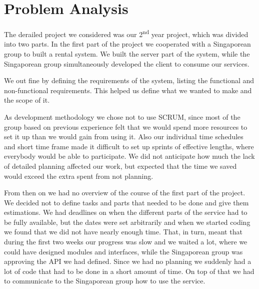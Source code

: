 \section{Problem Analysis}
The derailed project we considered was our 2\textsuperscript{nd} year project, which was divided into two parts. In the first part of the project we cooperated with a Singaporean group to built a rental system. We built the server part of the system, while the Singaporean group simultaneously developed the client to consume our services.

We out fine by defining the requirements of the system, listing the functional and non-functional requirements. This helped us define what we wanted to make and the scope of it.

As development methodology we chose not to use SCRUM, since most of the group based on previous experience felt that we would spend more resources to set it up than we would gain from using it. Also our individual time schedules and short time frame made it difficult to set up sprints of effective lengths, where everybody would be able to participate. We did not anticipate how much the lack of detailed planning affected our work, but expected that the time we saved would exceed the extra spent from not planning.


From then on we had no overview of the course of the first part of the project. We decided not to define tasks and parts that needed to be done and give them estimations.
We had deadlines on when the different parts of the service had to be fully available, but the dates were set arbitrarily and when we started coding we found that we did not have nearly enough time. That, in turn, meant that during the first two weeks our progress was slow and we waited a lot, where we could have designed modules and interfaces, while the Singaporean group was approving the API we had defined. Since we had no planning we suddenly had a lot of code that had to be done in a short amount of time. On top of that we had to communicate to the Singaporean group how to use the service.
 
